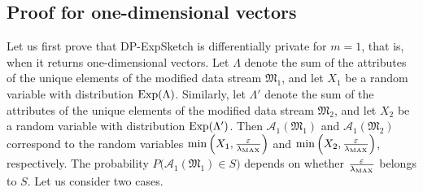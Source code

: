 \subsection{Proof for one-dimensional vectors}

Let us first prove that DP-ExpSketch is differentially private for $m = 1$, that is, when it returns one-dimensional vectors. Let $\Lambda$ denote the sum of the attributes of the unique elements of the modified data stream $\mathfrak{M}_1$, and let $X_1$ be a random variable with distribution $\operatorname{Exp}(\Lambda)$. Similarly, let $\Lambda'$ denote the sum of the attributes of the unique elements of the modified data stream $\mathfrak{M}_2$, and let $X_2$ be a random variable with distribution $\operatorname{Exp}(\Lambda')$. Then $\mathcal{A}_1(\mathfrak{M}_1)$ and $\mathcal{A}_1(\mathfrak{M}_2)$ correspond to the random variables $\min\left(X_1, \frac{\varepsilon}{\lambda_{\mathrm{MAX}}}\right)$ and $\min\left(X_2, \frac{\varepsilon}{\lambda_{\mathrm{MAX}}}\right)$, respectively. The probability $P\bigl(\mathcal{A}_1(\mathfrak{M}_1) \in S\bigr)$ depends on whether $\frac{\varepsilon}{\lambda_{\mathrm{MAX}}}$ belongs to $S$. Let us consider two cases.

